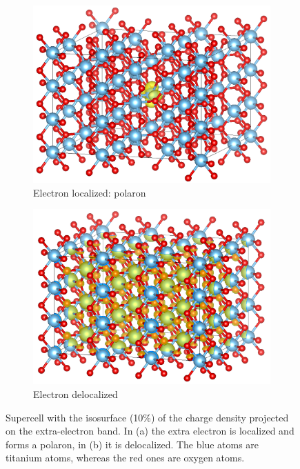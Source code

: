 \begin{figure}[p]
    \centering
    \begin{subfigure}[b]{0.49\textwidth}
        \centering
        \includegraphics[width=\textwidth]{figures/PARCHG_polaron_super}
        \caption{Electron localized: polaron}
        \label{fig:polaron_iso_super}
    \end{subfigure}
    \hfill
    \begin{subfigure}[b]{0.49\textwidth}
        \centering
        \includegraphics[width=\textwidth]{figures/PARCHG_delocalized_super}
        \caption{Electron delocalized}
        \label{fig:delocalized_iso_super}
    \end{subfigure}
    \caption[Supercell with the isosurface of the charge density projected on the extra-electron band]{Supercell with the isosurface  (10\%)  of the charge density projected on the extra-electron band. In (a) the extra electron is localized and forms a polaron, in (b) it is delocalized. The blue atoms are titanium atoms, whereas the red ones are oxygen atoms.
    }
    \label{fig:isosurfaces_supercell}
\end{figure}
